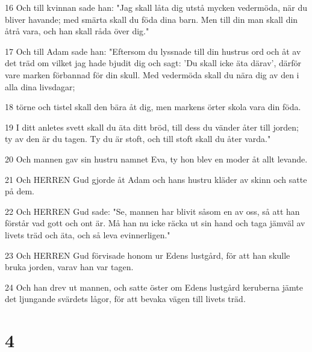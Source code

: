 \par 16 Och till kvinnan sade han: "Jag skall låta dig utstå mycken vedermöda, när du bliver havande; med smärta skall du föda dina barn. Men till din man skall din åtrå vara, och han skall råda över dig."
\par 17 Och till Adam sade han: "Eftersom du lyssnade till din hustrus ord och åt av det träd om vilket jag hade bjudit dig och sagt: 'Du skall icke äta därav', därför vare marken förbannad för din skull. Med vedermöda skall du nära dig av den i alla dina livsdagar;
\par 18 törne och tistel skall den bära åt dig, men markens örter skola vara din föda.
\par 19 I ditt anletes svett skall du äta ditt bröd, till dess du vänder åter till jorden; ty av den är du tagen. Ty du är stoft, och till stoft skall du åter varda."
\par 20 Och mannen gav sin hustru namnet Eva, ty hon blev en moder åt allt levande.
\par 21 Och HERREN Gud gjorde åt Adam och hans hustru kläder av skinn och satte på dem.
\par 22 Och HERREN Gud sade: "Se, mannen har blivit såsom en av oss, så att han förstår vad gott och ont är. Må han nu icke räcka ut sin hand och taga jämväl av livets träd och äta, och så leva evinnerligen."
\par 23 Och HERREN Gud förvisade honom ur Edens lustgård, för att han skulle bruka jorden, varav han var tagen.
\par 24 Och han drev ut mannen, och satte öster om Edens lustgård keruberna jämte det ljungande svärdets lågor, för att bevaka vägen till livets träd.

\chapter{4}

